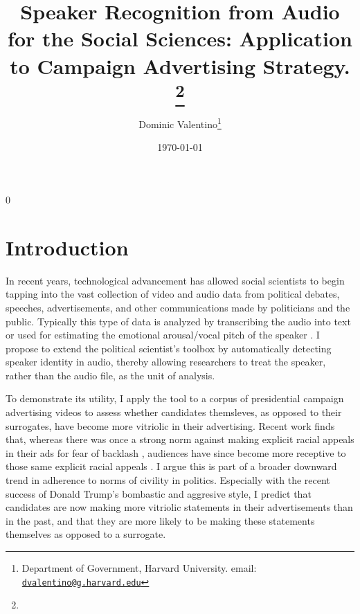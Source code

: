 \documentclass[12pt]{article}
\title{\sffamily\bfseries{Speaker Recognition from Audio for the Social Sciences: Application to Campaign Advertising Strategy.}%
  \if0\blind{}\thanks{}\fi%
}
\author{Dominic Valentino\thanks{Department of Government, Harvard University. email: \texttt{\href{dvalentino@g.harvard.edu }{dvalentino@g.harvard.edu}}}}
\date{\today \if1\submission{}\fi}
\newcommand{\submission}{0}
\begin{document}
\maketitle


% 
% 
% 

\submission{}
\setlength{\baselineskip}{1.9\baselineskip}
\else
\setlength{\baselineskip}{1.65\baselineskip}
\fi



\section{Introduction}
% 

In recent years, technological advancement has allowed social scientists to begin tapping into the vast collection of video and audio data from political debates, speeches, advertisements, and other communications made by politicians and the public. Typically this type of data is analyzed by transcribing the audio into text \citep[e.g., ][]{tarr2023automated} or used for estimating the emotional arousal/vocal pitch of the speaker \citep[e.g., ][]{dietrich2019pitch, dietrich2019emotional}. I propose to extend the political scientist's toolbox by automatically detecting speaker identity in audio, thereby allowing researchers to treat the speaker, rather than the audio file, as the unit of analysis.

To demonstrate its utility, I apply the tool to a corpus of presidential campaign advertising videos to assess whether candidates themsleves, as opposed to their surrogates, have become more vitriolic in their advertising. Recent work finds that, whereas there was once a strong norm against making explicit racial appeals in their ads for fear of backlash \citep{valentino2002cues}, audiences have since become more receptive to those same explicit racial appeals \citep{valentino2018changing}. I argue this is part of a broader downward trend in adherence to norms of civility in politics. Especially with the recent success of Donald Trump's bombastic and aggresive style, I predict that candidates are now making more vitriolic statements in their advertisements than in the past, and that they are more likely to be making these statements themselves as opposed to a surrogate.
\end{document}
